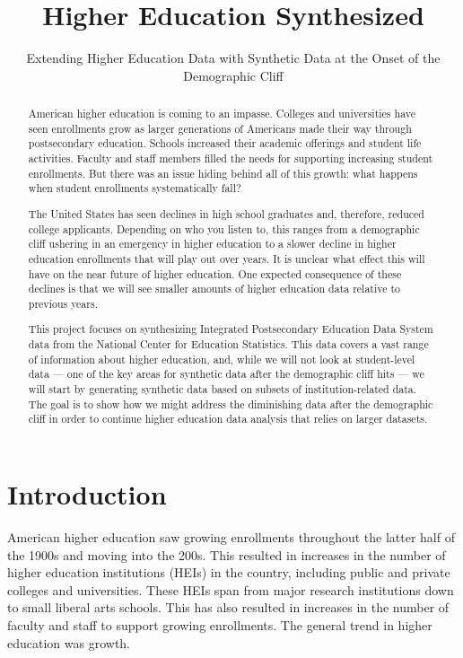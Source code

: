 \documentclass[sigconf, authorversion, nonacm]{acmart}
\begin{document}
\title{Higher Education Synthesized}
\subtitle{Extending Higher Education Data with Synthetic Data at the Onset of the Demographic Cliff}

\renewcommand{\shortauthors}{Leakakos}

\begin{abstract}
    American higher education is coming to an impasse. Colleges and universities have seen enrollments grow as larger generations of Americans made their way through postsecondary education. Schools increased their academic offerings and student life activities. Faculty and staff members filled the needs for supporting increasing student enrollments. But there was an issue hiding behind all of this growth: what happens when student enrollments systematically fall?

    The United States has seen declines in high school graduates and, therefore, reduced college applicants. Depending on who you listen to, this ranges from a demographic cliff ushering in an emergency in higher education to a slower decline in higher education enrollments that will play out over years. It is unclear what effect this will have on the near future of higher education. One expected consequence of these declines is that we will see smaller amounts of higher education data relative to previous years.

    This project focuses on synthesizing Integrated Postsecondary Education Data System data from the National Center for Education Statistics. This data covers a vast range of information about higher education, and, while we will not look at student-level data --- one of the key areas for synthetic data after the demographic cliff hits --- we will start by generating synthetic data based on subsets of institution-related data. The goal is to show how we might address the diminishing data after the demographic cliff in order to continue higher education data analysis that relies on larger datasets.
\end{abstract}

\maketitle

\section{Introduction}
    American higher education saw growing enrollments throughout the latter half of the 1900s and moving into the 200s. This resulted in increases in the number of higher education institutions (HEIs) in the country, including public and private colleges and universities. These HEIs span from major research institutions down to small liberal arts schools. This has also resulted in increases in the number of faculty and staff to support growing enrollments. The general trend in higher education was growth.
\end{document}

